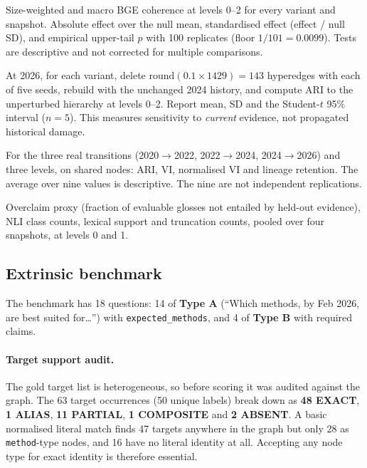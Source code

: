 \documentclass[11pt,a4paper]{article}
\theoremstyle{remark}
\newcommand{\code}[1]{\texttt{\small #1}}
\begin{document}
\begin{description}[leftmargin=0.5cm,style=nextline]
  \item[Coherence (P3)] Size-weighted and macro BGE coherence at levels 0--2 for every
        variant and snapshot. Absolute effect over the null mean, standardised effect
        (effect / null SD), and empirical upper-tail $p$ with 100 replicates (floor
        $1/101=0.0099$). Tests are descriptive and not corrected for multiple comparisons.
  \item[Perturbation stability (P5)] At 2026, for each variant, delete $\mathrm{round}(0.1\times1429)=143$
        hyperedges with each of five seeds, rebuild with the unchanged 2024 history, and
        compute ARI to the unperturbed hierarchy at levels 0--2. Report mean, SD and the
        Student-$t$ 95\% interval ($n=5$). This measures sensitivity to \emph{current}
        evidence, not propagated historical damage.
  \item[Temporal stability (P5)] For the three real transitions (2020$\to$2022,
        2022$\to$2024, 2024$\to$2026) and three levels, on shared nodes: ARI, VI,
        normalised VI and lineage retention. The average over nine values is descriptive.
        The nine are not independent replications.
  \item[Label faithfulness (P6)] Overclaim proxy (fraction of evaluable glosses not entailed
        by held-out evidence), NLI class counts, lexical support and truncation counts,
        pooled over four snapshots, at levels 0 and 1.
\end{description}

\subsection{Extrinsic benchmark}

The benchmark has 18 questions: 14 of \textbf{Type A} (``Which methods, by Feb 2026, are best
suited for\dots'') with \code{expected\_methods}, and 4 of \textbf{Type B} with required
claims.

\paragraph{Target support audit.}
The gold target list is heterogeneous, so before scoring it was audited against the graph.
The 63 target occurrences (50 unique labels) break down as
\textbf{48 EXACT}, \textbf{1 ALIAS}, \textbf{11 PARTIAL}, \textbf{1 COMPOSITE} and
\textbf{2 ABSENT}. A basic normalised literal match finds 47 targets anywhere in the graph
but only 28 as \code{method}-type nodes, and 16 have no literal identity at all. Accepting
any node type for exact identity is therefore essential.
\end{document}
